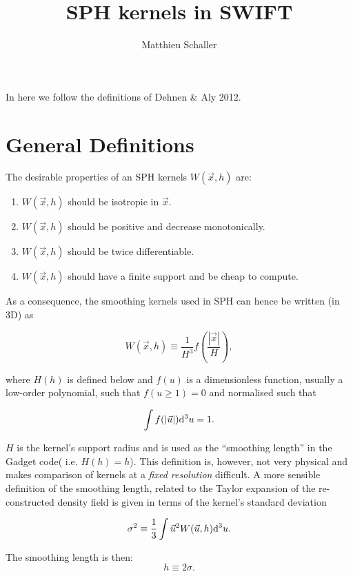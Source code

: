\documentclass[a4paper]{mnras}
\title{SPH kernels in SWIFT}
\author{Matthieu Schaller}
\begin{document}
\maketitle

In here we follow the definitions of Dehnen \& Aly 2012.

\section{General Definitions}

The desirable properties of an SPH kernels $W(\vec{x},h)$ are:
\begin{enumerate}
\item $W(\vec{x},h)$ should be isotropic in $\vec{x}$.
\item $W(\vec{x},h)$ should be positive and decrease monotonically.
\item $W(\vec{x},h)$ should be twice differentiable.
\item $W(\vec{x},h)$ should have a finite support and be cheap to
  compute.
\end{enumerate}

As a consequence, the smoothing kernels used in SPH can
hence be written (in 3D) as

\begin{equation}
 W(\vec{x},h) \equiv \frac{1}{H^3}f\left(\frac{|\vec{x}|}{H}\right),
\end{equation}

where $H(h)$ is defined below and $f(u)$ is a dimensionless function,
usually a low-order polynomial, such that $f(u \geq 1) = 0$ and
normalised such that

\begin{equation}
  \int f(|\vec{u}|){\rm d}^3u = 1.
\end{equation}

$H$ is the kernel's support radius and is used as the ``smoothing
length'' in the Gadget code( {i.e.} $H(h)=h$). This definition is,
however, not very physical and makes comparison of kernels at a
\emph{fixed resolution} difficult. A more sensible definition of the
smoothing length, related to the Taylor expansion of the
re-constructed density field is given in terms of the kernel's
standard deviation

\begin{equation}
  \sigma^2 \equiv \frac{1}{3}\int \vec{u}^2 W(\vec{u},h) {\rm d}^3u.
  \label{eq:sph:sigma}
\end{equation}

The smoothing length is then:
\begin{equation}
  h\equiv2\sigma.
    \label{eq:sph:h}
\end{equation}
\end{document}
